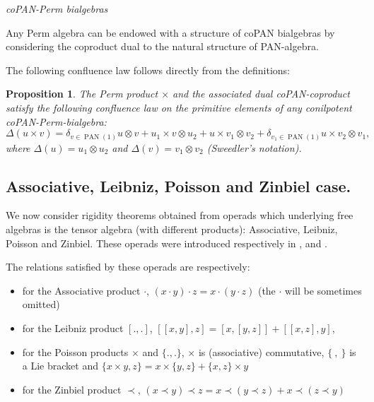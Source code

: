 \documentclass[11pt,leqno]{amsart}
\theoremstyle{definition}
\theoremstyle{plain}
\newtheorem{proposition}[definition]{Proposition}
\begin{document}
\begin{center}
\emph{coPAN-Perm bialgebras}
\end{center}

Any Perm algebra can be endowed with a structure of coPAN bialgebras by considering the coproduct dual to the natural structure of PAN-algebra.




The following confluence law follows directly from the definitions:
\begin{proposition}
The Perm product $\times$ and the associated dual coPAN-coproduct satisfy the following confluence law on the primitive elements of any conilpotent coPAN-Perm-bialgebra:
\begin{equation} \label{comprelPermPAN}
\Delta (u \times v) = \delta_{v \in \operatorname{PAN}(1)} u \otimes v + u_1 \times v \otimes u_2 + u \times v_1 \otimes v_2 + \delta_{v_1 \in \operatorname{PAN}(1)} u \times v_2 \otimes v_1, 
\end{equation}
where $\Delta(u) = u_1 \otimes u_2$ and $\Delta(v) = v_1 \otimes v_2$ (Sweedler's notation).
\end{proposition}

\subsection{Associative, Leibniz, Poisson and Zinbiel case.}

We now consider rigidity theorems obtained from operads which underlying free algebras is the tensor algebra (with different products): Associative, Leibniz, Poisson and Zinbiel. These operads were introduced respectively in \cite{Leibniz}, \cite{Poisson} and \cite{Zinbiel}.

The relations satisfied by these operads are respectively:
\begin{itemize}
\item for the Associative product $\cdot$, $(x\cdot y) \cdot z = x\cdot (y \cdot z)$ (the $\cdot$ will be sometimes omitted)
\item for the Leibniz product $[.,.]$, $[[x,y],z] = [x,[y,z]] + [[x,z],y]$,
\item for the Poisson products $\times$ and $\lbrace . , . \rbrace$, $\times$ is (associative) commutative, $\lbrace \ , \ \rbrace$ is a Lie bracket and $\lbrace x \times y, z \rbrace = x \times \lbrace y, z \rbrace + \lbrace x, z \rbrace \times y$
\item for the Zinbiel product $\prec$, $(x \prec y) \prec z = x \prec (y \prec z) + x \prec (z \prec y)$
\end{itemize} 
\end{document}
